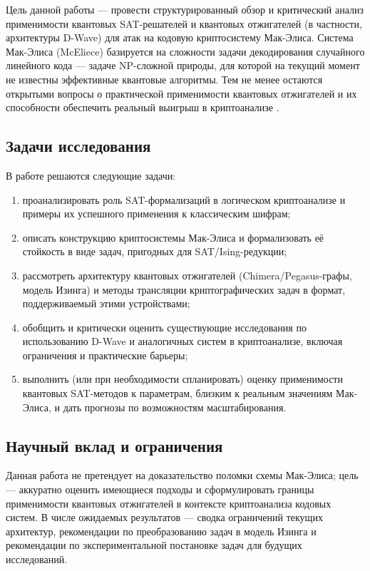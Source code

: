 Цель данной работы — провести структурированный обзор и критический анализ применимости квантовых SAT-решателей и квантовых отжигателей (в частности, архитектуры D-Wave) для атак на кодовую криптосистему Мак-Элиса. Система Мак-Элиса (McEliece) базируется на сложности задачи декодирования случайного линейного кода — задаче NP-сложной природы, для которой на текущий момент не известны эффективные квантовые алгоритмы. Тем не менее остаются открытыми вопросы о практической применимости квантовых отжигателей и их способности обеспечить реальный выигрыш в криптоанализе \cite{ClassicMcEliece2020}.

\subsection*{Задачи исследования}
В работе решаются следующие задачи:
\begin{enumerate}
    \item проанализировать роль SAT-формализаций в логическом криптоанализе и примеры их успешного применения к классическим шифрам;
    \item описать конструкцию криптосистемы Мак-Элиса и формализовать её стойкость в виде задач, пригодных для SAT/Ising-редукции;
    \item рассмотреть архитектуру квантовых отжигателей (Chimera/Pegasus-графы, модель Изинга) и методы трансляции криптографических задач в формат, поддерживаемый этими устройствами;
    \item обобщить и критически оценить существующие исследования по использованию D-Wave и аналогичных систем в криптоанализе, включая ограничения и практические барьеры;
    \item выполнить (или при необходимости спланировать) оценку применимости квантовых SAT-методов к параметрам, близким к реальным значениям Мак-Элиса, и дать прогнозы по возможностям масштабирования.
\end{enumerate}

\subsection*{Научный вклад и ограничения}
Данная работа не претендует на доказательство поломки схемы Мак-Элиса; цель — аккуратно оценить имеющиеся подходы и сформулировать границы применимости квантовых отжигателей в контексте криптоанализа кодовых систем. В числе ожидаемых результатов — сводка ограничений текущих архитектур, рекомендации по преобразованию задач в модель Изинга и рекомендации по экспериментальной постановке задач для будущих исследований.

